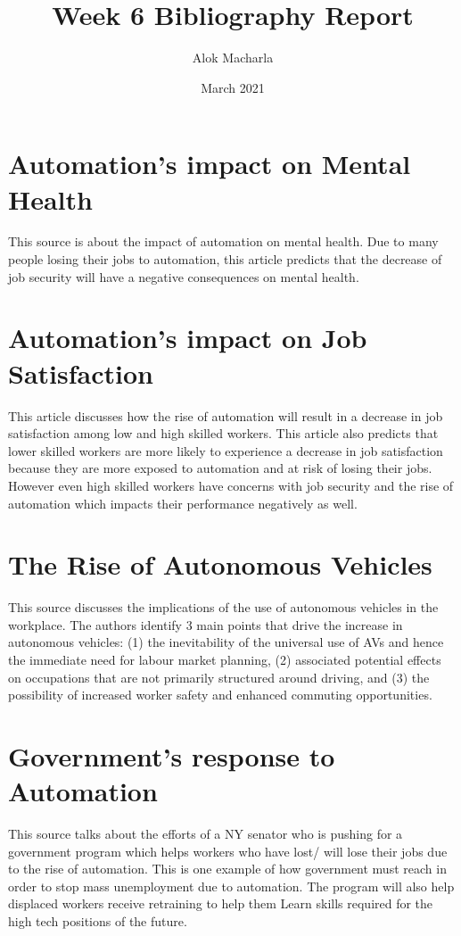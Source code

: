 \documentclass{article}
\title{Week 6 Bibliography Report}
\author{Alok Macharla}
\date{March 2021}
\begin{document}
 

\maketitle

\section{Automation's impact on Mental Health}
This source is about the impact of automation on mental health. Due to many people losing their jobs to automation, this article predicts that the decrease of job security will have a negative consequences on mental health. \cite{PATEL201854}

\section{Automation's impact on Job Satisfaction}
This article discusses how the rise of automation will result in a decrease in job satisfaction among low and high skilled workers. This article also predicts that lower skilled workers are more likely to experience a decrease in job satisfaction because they are more exposed to automation and at risk of losing their jobs. However even high skilled workers have concerns with job security and the rise of automation which impacts their performance negatively as well. \cite{3325322720201130}

\section{The Rise of Autonomous Vehicles}
This source discusses the implications of the use of autonomous vehicles in the workplace.
The authors identify 3 main points that drive the increase in autonomous vehicles:
(1) the inevitability of the universal use of AVs and hence the immediate need for labour market planning, (2) associated potential effects on occupations that are not primarily structured around driving, and (3) the possibility of increased worker safety and enhanced commuting opportunities.\cite{3020020620180830}

\section{Government's response to Automation}
This source talks about the efforts of a NY senator who is pushing for a government program which helps workers who have lost/ will lose their jobs due to the rise of automation. This is one example of how government must reach in order to stop mass unemployment due to automation. The program will also help displaced workers receive retraining to help them Learn skills required for the high tech positions of the future. \cite{edsgit.A54253820120180613}
\end{document}
